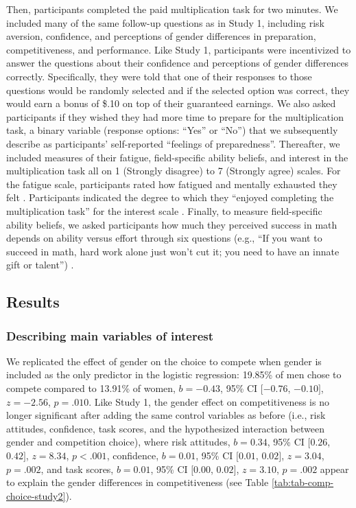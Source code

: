 \documentclass[letterpaper, nobind]{templates/ociamthesis}
\begin{document}
Then, participants completed the paid multiplication task for two minutes. We included many of the same follow-up questions as in Study 1, including risk aversion, confidence, and perceptions of gender differences in preparation, competitiveness, and performance. Like Study 1, participants were incentivized to answer the questions about their confidence and perceptions of gender differences correctly. Specifically, they were told that one of their responses to those questions would be randomly selected and if the selected option was correct, they would earn a bonus of \$.10 on top of their guaranteed earnings. We also asked participants if they wished they had more time to prepare for the multiplication task, a binary variable (response options: ``Yes'' or ``No'') that we subsequently describe as participants' self-reported ``feelings of preparedness''. Thereafter, we included measures of their fatigue, field-specific ability beliefs, and interest in the multiplication task all on 1 (Strongly disagree) to 7 (Strongly agree) scales. For the fatigue scale, participants rated how fatigued and mentally exhausted they felt \autocite{Milyavskaya2018}. Participants indicated the degree to which they ``enjoyed completing the multiplication task'' for the interest scale \autocite{Milyavskaya2018}. Finally, to measure field-specific ability beliefs, we asked participants how much they perceived success in math depends on ability versus effort through six questions (e.g., ``If you want to succeed in math, hard work alone just won't cut it; you need to have an innate gift or talent'') \autocite{Meyer2015}.

\hypertarget{results-1}{%
\subsection{Results}\label{results-1}}

\hypertarget{describing-main-variables-of-interest-1}{%
\subsubsection{Describing main variables of interest}\label{describing-main-variables-of-interest-1}}

We replicated the effect of gender on the choice to compete when gender is included as the only predictor in the logistic regression: 19.85\% of men chose to compete compared to 13.91\% of women, \(b = -0.43\), 95\% CI \([-0.76\), \(-0.10]\), \(z = -2.56\), \(p = .010\). Like Study 1, the gender effect on competitiveness is no longer significant after adding the same control variables as before (i.e., risk attitudes, confidence, task scores, and the hypothesized interaction between gender and competition choice), where risk attitudes, \(b = 0.34\), 95\% CI \([0.26\), \(0.42]\), \(z = 8.34\), \(p < .001\), confidence, \(b = 0.01\), 95\% CI \([0.01\), \(0.02]\), \(z = 3.04\), \(p = .002\), and task scores, \(b = 0.01\), 95\% CI \([0.00\), \(0.02]\), \(z = 3.10\), \(p = .002\) appear to explain the gender differences in competitiveness (see Table \ref{tab:tab-comp-choice-study2}).
\end{document}
